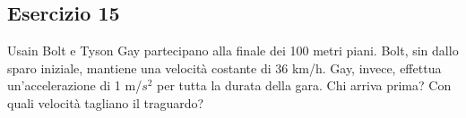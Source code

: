 \documentclass[12pt,a4paper]{book}
\begin{document}


\subsection*{Esercizio 15}
Usain Bolt e Tyson Gay partecipano alla finale dei 100 metri piani. Bolt, sin dallo sparo iniziale, mantiene una velocità costante di 36 km/h. Gay, invece, effettua un'accelerazione di 1 m/$s^2$ per tutta la durata della gara. Chi arriva prima? Con quali velocità tagliano il traguardo?
\end{document}

